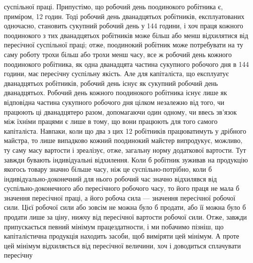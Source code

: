суспільної праці. Припустімо, що робочий день поодинокого
робітника є, приміром, 12 годин. Тоді робочий день дванадцятьох
робітників, експлуатованих одночасно, становить сукупний
робочий день у 144 години, і хоч праця кожного поодинокого
з тих дванадцятьох робітників може більш або менш відхилятися
від пересічної суспільної праці; отже, поодинокий робітник
може потребувати на ту саму роботу трохи більш або трохи менш
часу, все ж робочий день кожного поодинокого робітника, як
одна дванадцята частина сукупного робочого дня в 144 години,
має пересічну суспільну якість. Але для капіталіста, що експлуатує
дванадцятьох робітників, робочий день існує як сукупний
робочий день дванадцятьох. Робочий день кожного поодинокого
робітника існує лише як відповідна частина сукупного робочого
дня цілком незалежно від того, чи працюють ці дванадцятеро
разом, допомагаючи один одному, чи ввесь зв’язок між їхніми
працями є лише в тому, що вони працюють для того самого капіталіста.
Навпаки, коли що два з цих 12 робітників працюватимуть
у дрібного майстра, то лише випадково кожний поодинокий майстер
випродукує, можливо, ту саму масу вартости і зреалізує,
отже, загальну норму додаткової вартости. Тут завжди бувають
індивідуальні відхилення. Коли б робітник зуживав на продукцію
якогось товару значно більше часу, ніж це суспільно-потрібно,
коли б індивідуально-доконечний для нього робочий
час значно відхилявся від суспільно-доконечного або пересічного
робочого часу, то його праця не мала б значення пересічної праці,
а його робоча сила — значення пересічної робочої сили. Цієї робочої
сили або зовсім не можна було б продати, або її можна було б
продати лише за ціну, нижчу від пересічної вартости робочої сили.
Отже, завжди припускається певний мінімум працездатности, і ми
побачимо пізніш, що капіталістична продукція находить засоби,
щоб виміряти цей мінімум. А проте цей мінімум відхиляється
від пересічної величини, хоч і доводиться сплачувати пересічну
\parbreak{}  %

